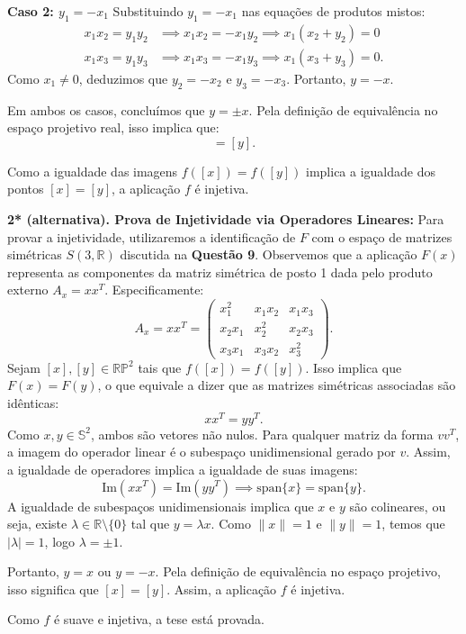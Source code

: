 {	\textbf{Caso 2: $y_1 = -x_1$}
	Substituindo $y_1 = -x_1$ nas equações de produtos mistos:
	\begin{align*}
		x_1x_2 = y_1y_2 &\implies x_1x_2 = -x_1y_2 \implies x_1(x_2 + y_2) = 0 \\
		x_1x_3 = y_1y_3 &\implies x_1x_3 = -x_1y_3 \implies x_1(x_3 + y_3) = 0.
	\end{align*}
	Como $x_1 \neq 0$, deduzimos que $y_2 = -x_2$ e $y_3 = -x_3$. Portanto, $y = -x$.
	
	Em ambos os casos, concluímos que $y = \pm x$. Pela definição de equivalência no espaço projetivo real, isso implica que:
	\begin{equation*}
		[x] = [y].
	\end{equation*}
	
	Como a igualdade das imagens $f([x]) = f([y])$ implica a igualdade dos pontos $[x] = [y]$, a aplicação $f$ é injetiva.
	
	\textbf{2* (alternativa). Prova de Injetividade via Operadores Lineares:}
	Para provar a injetividade, utilizaremos a identificação de $F$ com o espaço de matrizes simétricas $S(3, \mathbb{R})$ discutida na \textbf{Questão 9}. Observemos que a aplicação $F(x)$ representa as componentes da matriz simétrica de posto 1 dada pelo produto externo $A_x = x x^T$. Especificamente:
	\begin{equation*}
		A_x = x x^T = \begin{pmatrix} x_1^2 & x_1x_2 & x_1x_3 \\ x_2x_1 & x_2^2 & x_2x_3 \\ x_3x_1 & x_3x_2 & x_3^2 \end{pmatrix}.
	\end{equation*}
	Sejam $[x], [y] \in \mathbb{RP}^2$ tais que $f([x]) = f([y])$. Isso implica que $F(x) = F(y)$, o que equivale a dizer que as matrizes simétricas associadas são idênticas:
	\begin{equation*}
		x x^T = y y^T.
	\end{equation*}
	Como $x, y \in \mathbb{S}^2$, ambos são vetores não nulos. Para qualquer matriz da forma $v v^T$, a imagem do operador linear é o subespaço unidimensional gerado por $v$. Assim, a igualdade de operadores implica a igualdade de suas imagens:
	\begin{equation*}
		\text{Im}(x x^T) = \text{Im}(y y^T) \implies \text{span}\{x\} = \text{span}\{y\}.
	\end{equation*}
	A igualdade de subespaços unidimensionais implica que $x$ e $y$ são colineares, ou seja, existe $\lambda \in \mathbb{R} \setminus \{0\}$ tal que $y = \lambda x$. Como $\|x\| = 1$ e $\|y\| = 1$, temos que $|\lambda| = 1$, logo $\lambda = \pm 1$.
	
	Portanto, $y = x$ ou $y = -x$. Pela definição de equivalência no espaço projetivo, isso significa que $[x] = [y]$. Assim, a aplicação $f$ é injetiva.
	
	Como $f$ é suave e injetiva, a tese está provada.	
}
